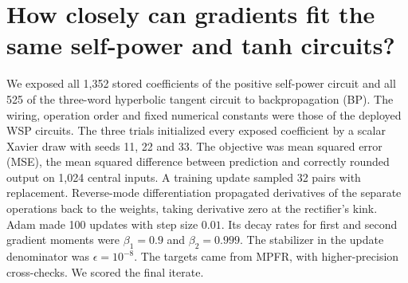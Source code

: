 \section{How closely can gradients fit the same self-power and tanh circuits?}
\label{app:smooth-optimizer}
We exposed all 1,352 stored coefficients of the positive self-power circuit and all 525 of the three-word hyperbolic tangent circuit to backpropagation (BP). The wiring, operation order and fixed numerical constants were those of the deployed WSP circuits. The three trials initialized every exposed coefficient by a scalar Xavier draw with seeds 11, 22 and 33. The objective was mean squared error (MSE), the mean squared difference between prediction and correctly rounded output on 1,024 central inputs. A training update sampled 32 pairs with replacement. Reverse-mode differentiation propagated derivatives of the separate operations back to the weights, taking derivative zero at the rectifier's kink. Adam made 100 updates with step size $0.01$. Its decay rates for first and second gradient moments were $\beta_1=0.9$ and $\beta_2=0.999$. The stabilizer in the update denominator was $\epsilon=10^{-8}$. The targets came from MPFR, with higher-precision cross-checks. We scored the final iterate.

